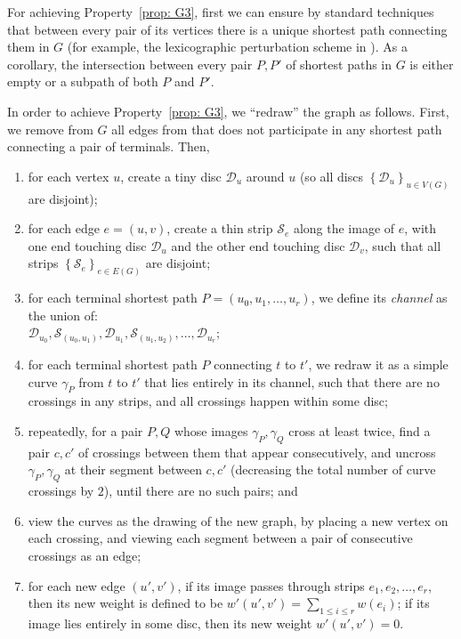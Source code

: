 \documentclass[11pt]{article}
\newcommand{\dset}{{\mathcal{D}}}
\newcommand{\sset}{{\mathcal{S}}}
\newcommand{\set}[1]{\left\{ #1 \right\}}
\begin{document}
For achieving Property~\ref{prop: G3}, first we can ensure by standard techniques that between every pair of its vertices there is a unique shortest path connecting them in $G$ (for example, the lexicographic perturbation scheme in \cite{erickson2018holiest}).
As a corollary, the intersection between every pair $P,P'$ of shortest paths in $G$ is either empty or a subpath of both $P$ and $P'$.

In order to achieve Property~\ref{prop: G3}, we ``redraw'' the graph as follows. First, we remove from $G$ all edges from that does not participate in any shortest path connecting a pair of terminals. Then,
\begin{enumerate}
\item for each vertex $u$, create a tiny disc $\dset_u$ around $u$ (so all discs $\set{\dset_u}_{u\in V(G)}$ are disjoint);
\item for each edge $e=(u,v)$, create a thin strip $\sset_e$ along the image of $e$, with one end touching disc $\dset_u$ and the other end touching disc $\dset_v$, such that all strips $\set{\sset_e}_{e\in E(G)}$ are disjoint;
\item for each terminal shortest path $P=(u_0,u_1,\ldots,u_r)$, we define its \emph{channel} as the union of:\\ $\dset_{u_0},\sset_{(u_0,u_1)}, \dset_{u_1},\sset_{(u_1,u_2)},\ldots,\dset_{u_r}$;
\item for each terminal shortest path $P$ connecting $t$ to $t'$, we redraw it as a simple curve $\gamma_P$ from $t$ to $t'$ that lies entirely in its channel, such that there are no crossings in any strips, and all crossings happen within some disc;
\item repeatedly, for a pair $P,Q$ whose images $\gamma_P,\gamma_Q$ cross at least twice, find a pair $c,c'$ of crossings between them that appear consecutively, and uncross $\gamma_P,\gamma_Q$ at their segment between $c,c'$ (decreasing the total number of curve crossings by $2$), until there are no such pairs; and
\item view the curves as the drawing of the new graph, by placing a new vertex on each crossing, and viewing each segment between a pair of consecutive crossings as an edge;
\item for each new edge $(u',v')$, if its image passes through strips $e_1,e_2,\ldots,e_r$, then its new weight is defined to be $w'(u',v')=\sum_{1\le i\le r}w(e_i)$; if its image lies entirely in some disc, then its new weight $w'(u',v')=0$.
\end{enumerate}
 
\end{document}
